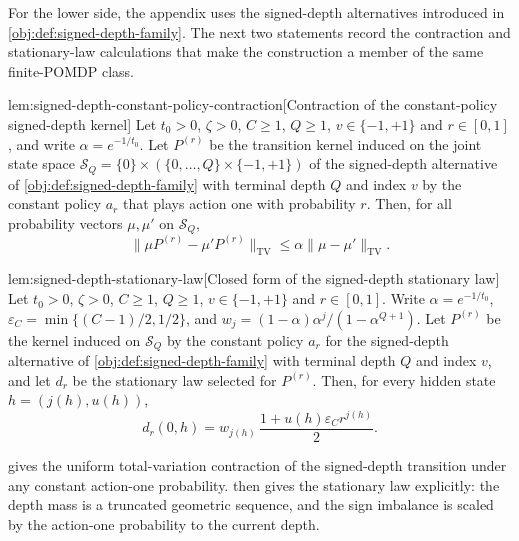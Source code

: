 For the lower side, the appendix uses the signed-depth alternatives introduced in \cref{obj:def:signed-depth-family}. The next two statements record the contraction and stationary-law calculations that make the construction a member of the same finite-POMDP class.

\begin{lemmav}{lem:signed-depth-constant-policy-contraction}[Contraction of the constant-policy signed-depth kernel]
Let \(t_0>0\), \(\zeta>0\), \(C\ge1\), \(Q\ge1\), \(v\in\{-1,+1\}\) and \(r\in[0,1]\), and write \(\alpha=e^{-1/t_0}\). Let \(P^{(r)}\) be the transition kernel induced on the joint state space \(\mathcal S_Q=\{0\}\times(\{0,\ldots,Q\}\times\{-1,+1\})\) of the signed-depth alternative of \cref{obj:def:signed-depth-family} with terminal depth \(Q\) and index \(v\) by the constant policy \(a_r\) that plays action one with probability \(r\). Then, for all probability vectors \(\mu,\mu'\) on \(\mathcal S_Q\),
\[
\|\mu P^{(r)}-\mu'P^{(r)}\|_{\mathrm{TV}}
\le
\alpha\|\mu-\mu'\|_{\mathrm{TV}} .
\]
\end{lemmav}

\begin{lemmav}{lem:signed-depth-stationary-law}[Closed form of the signed-depth stationary law]
Let \(t_0>0\), \(\zeta>0\), \(C\ge1\), \(Q\ge1\), \(v\in\{-1,+1\}\) and \(r\in[0,1]\). Write \(\alpha=e^{-1/t_0}\), \(\varepsilon_C=\min\{(C-1)/2,1/2\}\), and \(w_j=(1-\alpha)\alpha^{j}/(1-\alpha^{Q+1})\). Let \(P^{(r)}\) be the kernel induced on \(\mathcal S_Q\) by the constant policy \(a_r\) for the signed-depth alternative of \cref{obj:def:signed-depth-family} with terminal depth \(Q\) and index \(v\), and let \(d_r\) be the stationary law selected for \(P^{(r)}\). Then, for every hidden state \(h=(j(h),u(h))\),
\[
d_r(0,h)
=
w_{j(h)}\,\frac{1+u(h)\varepsilon_Cr^{j(h)}}{2}.
\]
\end{lemmav}

 gives the uniform total-variation contraction of the signed-depth transition under any constant action-one probability.  then gives the stationary law explicitly: the depth mass is a truncated geometric sequence, and the sign imbalance is scaled by the action-one probability to the current depth.

